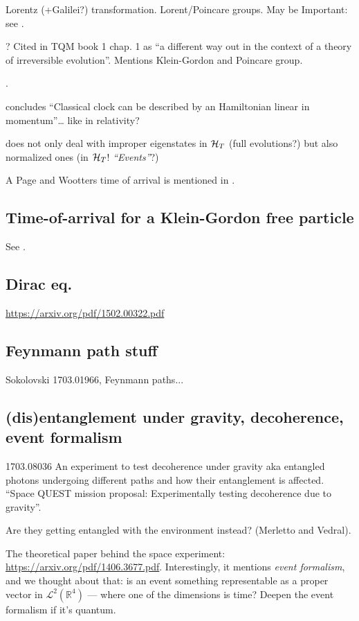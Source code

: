 Lorentz (+Galilei?) transformation. Lorent/Poincare groups. May be Important:
see \cite{LocalizationEntanglmentRelativistic}.

\cite{Misra}? Cited in TQM book 1 chap. 1 as 
``a different way out in the context of a theory of irreversible evolution''.
Mentions Klein-Gordon and Poincare group.

\cite{RealisticClocks}.

\cite{HarmonicClocks} concludes ``Classical clock can be described by an Hamiltonian linear in momentum''\dots
like in relativity?

\cite{Lloyd:Time} does not only deal with improper eigenstates in $\mathcal{H}_T$
(full evolutions?)
but also normalized ones (in $\mathcal{H}_T$! \emph{``Events''}?)

A Page and Wootters time of arrival is mentioned in \cite{Gambini_PW}.

\subsection{Time-of-arrival for a Klein-Gordon free particle}

See \cite{Galapon_KG}.

\subsection{Dirac eq.}

\url{https://arxiv.org/pdf/1502.00322.pdf}



\subsection{Feynmann path stuff}

Sokolovski 1703.01966, Feynmann paths...\subsection{(dis)entanglement under gravity, decoherence, event formalism}

1703.08036 An experiment to test decoherence under gravity aka entangled photons undergoing different paths and how their entanglement is affected.
``Space QUEST mission proposal: Experimentally testing decoherence due to gravity''.

Are they getting entangled with the environment instead? (Merletto and Vedral).

The theoretical paper behind the space experiment: \url{https://arxiv.org/pdf/1406.3677.pdf}. Interestingly, it mentions 
\emph{event formalism}, and we thought about that: is an event something
representable as a proper vector in $\mathscr{L}^2(\mathbb{R}^4)$ --- where one of the dimensions is time?
Deepen the event formalism if it's quantum.

